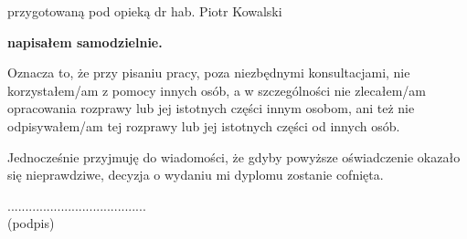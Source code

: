 \documentclass[twoside,a4paper,12pt]{report} %
\theoremstyle{break}
\begin{document}
\begin{center}
    {\large przygotowaną pod opieką dr hab. Piotr Kowalski}\par\vspace{0.4cm}\par
    {\bf napisałem samodzielnie.}
\end{center}
\par\vspace{0.6cm}\par

Oznacza to, że przy pisaniu pracy, poza niezbędnymi konsultacjami, nie korzystałem/am z pomocy innych osób, a w szczególności nie zlecałem/am opracowania rozprawy lub jej istotnych części innym osobom, ani też nie odpisywałem/am tej rozprawy lub jej istotnych części od innych osób.
\par
Jednocześnie przyjmuję do wiadomości, że gdyby powyższe oświadczenie okazało się nieprawdziwe, decyzja o wydaniu mi dyplomu zostanie cofnięta.
\par\vspace{2cm}\par
\begin{flushright}
....................................... \ \ \ \ \ \ \\
{\scriptsize (podpis)\hspace{2.3cm}\ }
\end{flushright}
\end{document}
